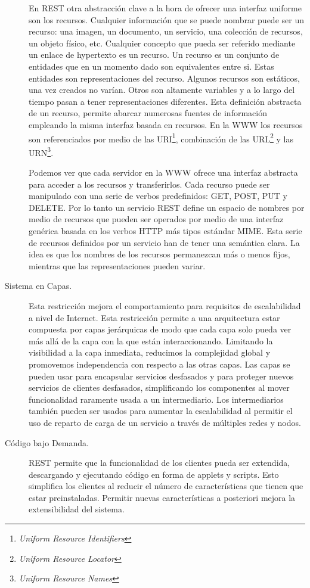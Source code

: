 \begin{description}
  En REST otra abstracción clave a la hora de ofrecer una interfaz
  uniforme son los recursos. Cualquier información que se puede
  nombrar puede ser un recurso: una imagen, un documento, un servicio,
  una colección de recursos, un objeto físico, etc. Cualquier concepto
  que pueda ser referido mediante un enlace de hypertexto es un
  recurso. Un recurso es un conjunto de entidades que en un momento
  dado son equivalentes entre si. Estas entidades son representaciones
  del recurso. Algunos recursos son estáticos, una vez creados no
  varían. Otros son altamente variables y a lo largo del tiempo pasan
  a tener representaciones diferentes. Esta definición abstracta de un
  recurso, permite abarcar numerosas fuentes de información empleando
  la misma interfaz basada en recursos. En la WWW los recursos son
  referenciados por medio de las URI\footnote{\emph{Uniform Resource
      Identifiers}}, combinación de las URL\footnote{\emph{Uniform
      Resource Locator}} y las URN\footnote{\emph{Uniform Resource
      Names}}.

  Podemos ver que cada servidor en la WWW ofrece una interfaz
  abstracta para acceder a los recursos y transferirlos. Cada recurso
  puede ser manipulado con una serie de verbos predefinidos: GET,
  POST, PUT y DELETE. Por lo tanto un servicio REST define un espacio
  de nombres por medio de recursos que pueden ser operados por medio
  de una interfaz genérica basada en los verbos HTTP más tipos
  estándar MIME. Esta serie de recursos definidos por un servicio han
  de tener una semántica clara. La idea es que los nombres de los
  recursos permanezcan más o menos fijos, mientras que las
  representaciones pueden variar.

\item[Sistema en Capas.] Esta restricción mejora el comportamiento para
  requisitos de escalabilidad a nivel de Internet. Esta restricción
  permite a una arquitectura estar compuesta por capas jerárquicas de
  modo que cada capa solo pueda ver más allá de la capa con la que
  están interaccionando. Limitando la visibilidad a la capa inmediata,
  reducimos la complejidad global y promovemos independencia con
  respecto a las otras capas. Las capas se pueden usar para encapsular
  servicios desfasados y para proteger nuevos servicios de clientes
  desfasados, simplificando los componentes al mover funcionalidad
  raramente usada a un intermediario. Los intermediarios también
  pueden ser usados para aumentar la escalabilidad al permitir el uso
  de reparto de carga de un servicio a través de múltiples redes y
  nodos.

\item[Código bajo Demanda.] REST permite que la funcionalidad de los
  clientes pueda ser extendida, descargando y ejecutando código en
  forma de applets y scripts. Esto simplifica los clientes al reducir
  el número de características que tienen que estar
  preinstaladas. Permitir nuevas características a posteriori mejora
  la extensibilidad del sistema.
\end{description}

